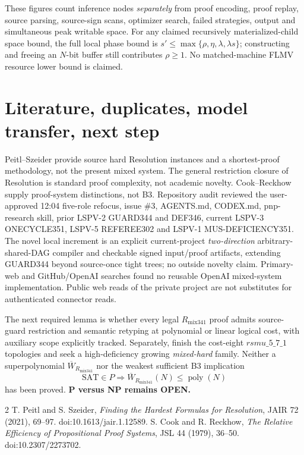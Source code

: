 \documentclass[11pt]{article}
\begin{document}
These figures count inference nodes \emph{separately} from proof encoding, proof replay, source parsing, source-sign scans, optimizer search, failed strategies, output and simultaneous peak writable space. For any claimed recursively materialized-child space bound, the full local phase bound is $s'\le\max\{\rho,\eta,\lambda,\lambda s\}$; constructing and freeing an $N$-bit buffer still contributes $\rho\ge1$. No matched-machine FLMV resource lower bound is claimed.

\section*{Literature, duplicates, model transfer, next step}
Peitl--Szeider \cite{PS2021} provide source hard Resolution instances and a shortest-proof methodology, not the present mixed system. The general restriction closure of Resolution is standard proof complexity, not academic novelty. Cook--Reckhow \cite{CR1979} supply proof-system distinctions, not B3. Repository audit reviewed the user-approved 12:04 five-role refocus, issue \#3, AGENTS.md, CODEX.md, pnp-research skill, prior LSPV-2 GUARD344 and DEF346, current LSPV-3 ONECYCLE351, LSPV-5 REFEREE302 and LSPV-1 MUS-DEFICIENCY351. The novel local increment is an explicit current-project \emph{two-direction} arbitrary-shared-DAG compiler and checkable signed input/proof artifacts, extending GUARD344 beyond source-once tight trees; no outside novelty claim. Primary-web and GitHub/OpenAI searches found no reusable OpenAI mixed-system implementation. Public web reads of the private project are not substitutes for authenticated connector reads.

The next required lemma is whether every legal $R_{\mathrm{mix341}}$ proof admits source-guard restriction and semantic retyping at polynomial or linear logical cost, with auxiliary scope explicitly tracked. Separately, finish the cost-eight $rsmu\_5\_7\_1$ topologies and seek a high-deficiency growing \emph{mixed-hard} family. Neither a superpolynomial $\overline W_{R_{\mathrm{mix341}}}$ nor the weakest sufficient B3 implication
\[
\mathrm{SAT}\in P\Longrightarrow \overline W_{R_{\mathrm{mix341}}}(N)\le\operatorname{poly}(N)
\]
has been proved. \textbf{P versus NP remains OPEN.}
\begin{thebibliography}{2}
 T. Peitl and S. Szeider, \emph{Finding the Hardest Formulas for Resolution}, JAIR 72 (2021), 69--97. doi:10.1613/jair.1.12589.
 S. Cook and R. Reckhow, \emph{The Relative Efficiency of Propositional Proof Systems}, JSL 44 (1979), 36--50. doi:10.2307/2273702.
\end{thebibliography}
\end{document}
